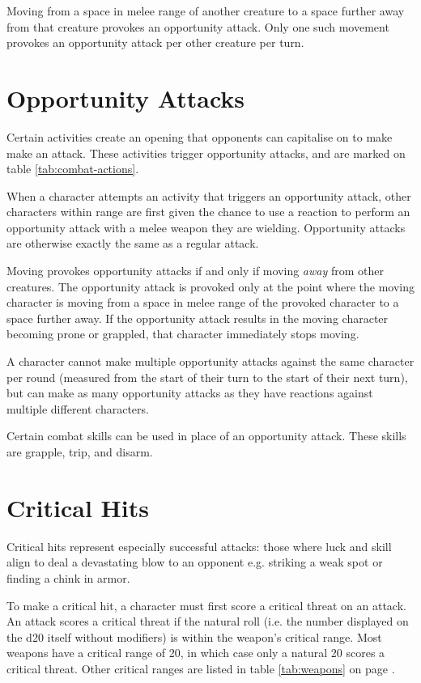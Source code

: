 \begin{multicols*}{2}
    Moving from a space in melee range of another creature to a space further
    away from that creature provokes an opportunity attack. Only one such
    movement provokes an opportunity attack per other creature per turn.

    \section{Opportunity Attacks}\label{combat:opportunity-attacks}
    Certain activities create an opening that opponents can capitalise on to
    make make an attack. These activities trigger opportunity attacks, and
    are marked on table \ref{tab:combat-actions}.

    When a character attempts an activity that triggers an opportunity attack,
    other characters within range are first given the chance to use a reaction
    to perform an opportunity attack with a melee weapon they are wielding.
    Opportunity attacks are otherwise exactly the same as a regular attack.

    Moving provokes opportunity attacks if and only if moving \textit{away}
    from other creatures. The opportunity attack is provoked only at the
    point where the moving character is moving from a space in melee range of
    the provoked character to a space further away. If the opportunity attack
    results in the moving character becoming prone or grappled, that character
    immediately stops moving.

    A character cannot make multiple opportunity attacks against the same
    character per round (measured from the start of their turn to the start
    of their next turn), but can make as many opportunity attacks as they have
    reactions against multiple different characters.

    Certain combat skills can be used in place of an opportunity attack. These
    skills are grapple, trip, and disarm.

    \section{Critical Hits}\label{combat:critical-hits}
    Critical hits represent especially successful attacks: those where luck and
    skill align to deal a devastating blow to an opponent e.g. striking a weak
    spot or finding a chink in armor.

    To make a critical hit, a character must first score a critical
    threat on an attack. An attack scores a critical
    threat if the natural roll (i.e. the number displayed on the d20 itself
    without modifiers) is within the weapon's critical range. Most weapons
    have a critical range of 20, in which case only a natural 20 scores a
    critical threat. Other critical ranges are listed in table
    \ref{tab:weapons} on page \pageref{tab:weapons}.


\end{multicols*}
